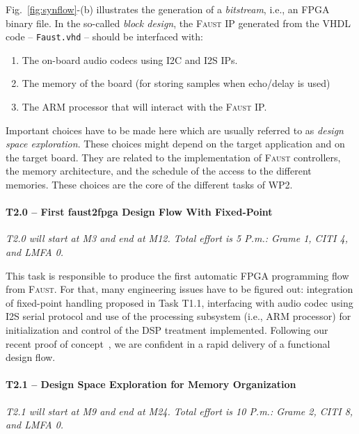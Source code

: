 \documentclass[a4paper,9pt]{extarticle}
\newcommand{\F}{\textsc{Faust}}
\begin{document}

Fig.~\ref{fig:synflow}-(b) illustrates the generation of a {\em bitstream}, i.e., an FPGA binary file. In the so-called {\em block design}, the   \F{} IP generated from the VHDL code -- {\tt Faust.vhd} -- should be interfaced with:
\begin{enumerate}
\item The on-board audio codecs using I2C and I2S IPs.
\item The memory of the board (for storing samples when echo/delay is used)
\item The ARM processor that will interact with the \F{} IP.

\end{enumerate}

Important choices have to be made here which are usually referred to as {\em design space exploration}. These choices might depend on the target application and on the target board. They are related to the implementation of \F{} controllers, the memory architecture, and the schedule of the access to the different memories. These choices are the core of the different tasks of WP2.

\paragraph{T2.0 -- First faust2fpga Design Flow With Fixed-Point}
\textit{T2.0 will start at M3 and end at M12. Total effort is 5 P.m.: Grame 1, CITI 4, and LMFA 0.}

This task is responsible to produce the first automatic FPGA programming flow from \F{}. For that, many engineering issues have to be figured out: integration of fixed-point handling proposed in Task T1.1, interfacing with audio codec using I2S serial protocol and use of the processing subsystem (i.e., ARM processor) for initialization and control of the DSP treatment implemented. Following our recent proof of concept~\cite{risset2020}, we are confident in a rapid delivery of a functional design flow.

\paragraph{T2.1 -- Design Space Exploration for Memory Organization}
\textit{T2.1 will start at M9 and end at M24. Total effort is 10 P.m.: Grame 2, CITI 8, and LMFA 0.}
\end{document}
